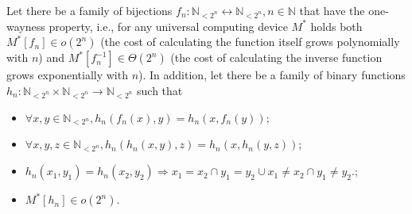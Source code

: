 Let there be a family of bijections $f_n: \mathbb{N}_{<2^n} \leftrightarrow \mathbb{N}_{<2^n}, n \in \mathbb{N}$ that have the one-wayness property, i.e., for any universal computing device $M^*$ holds both $M^*[f_n] \in o(2^n)$ (the cost of calculating the function itself grows polynomially with $n$) and $M^*[f_n^{- 1}] \in \Theta(2^n)$ (the cost of calculating the inverse function grows exponentially with $n$). In addition, let there be a family of binary functions $h_n : \mathbb{N}_{<2^n} \times \mathbb{N}_{<2^n} \rightarrow \mathbb{N}_{<2^n }$ such that %
\begin{itemize}
	\item $\forall x, y \in \mathbb{N}_{<2^n}, h_n(f_n(x), y) = h_n(x, f_n(y))$;
	\item $\forall x, y, z \in \mathbb{N}_{<2^n}, h_n(h_n(x, y), z) = h_n(x, h_n(y, z))$;
	\item $h_n(x_1, y_1) = h_n(x_2, y_2) \Rightarrow x_1 = x_2 \cap y_1 = y_2 \cup x_1 \neq x_2 \cap y_1 \neq y_2$.;
	\item $M^*[h_n] \in o(2^n)$.
\end{itemize}

